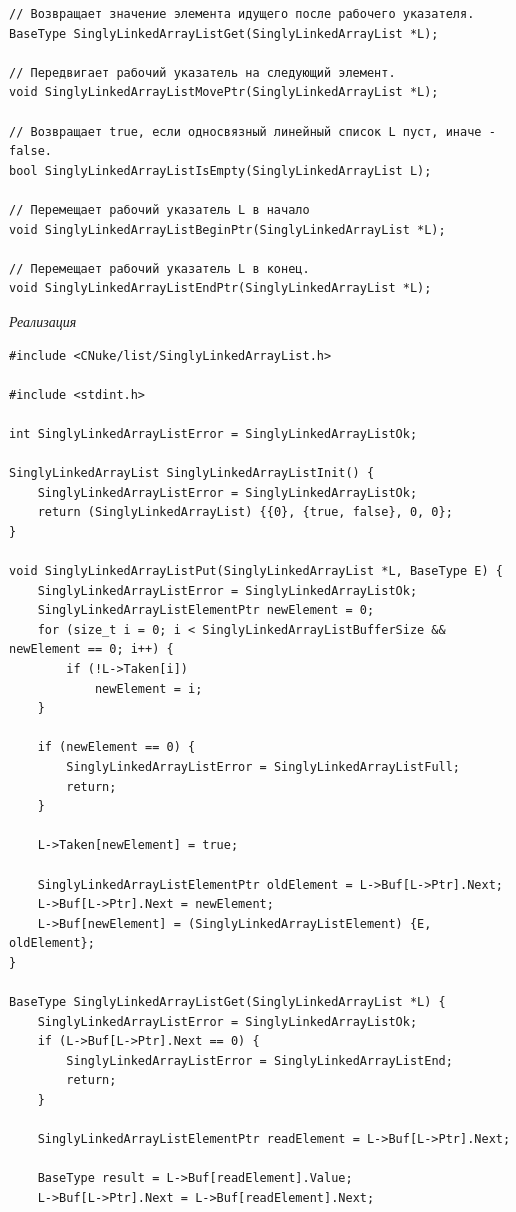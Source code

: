 \documentclass[a4paper,14pt]{extarticle}
\begin{document}
\begin{enumerate}
\begin{verbatim}
// Возвращает значение элемента идущего после рабочего указателя.
BaseType SinglyLinkedArrayListGet(SinglyLinkedArrayList *L);

// Передвигает рабочий указатель на следующий элемент.
void SinglyLinkedArrayListMovePtr(SinglyLinkedArrayList *L);

// Возвращает true, если односвязный линейный список L пуст, иначе - false.
bool SinglyLinkedArrayListIsEmpty(SinglyLinkedArrayList L);

// Перемещает рабочий указатель L в начало
void SinglyLinkedArrayListBeginPtr(SinglyLinkedArrayList *L);

// Перемещает рабочий указатель L в конец.
void SinglyLinkedArrayListEndPtr(SinglyLinkedArrayList *L);
    \end{verbatim}
    \textit{Реализация}
\begin{verbatim}
#include <CNuke/list/SinglyLinkedArrayList.h>

#include <stdint.h>

int SinglyLinkedArrayListError = SinglyLinkedArrayListOk;

SinglyLinkedArrayList SinglyLinkedArrayListInit() {
    SinglyLinkedArrayListError = SinglyLinkedArrayListOk;
    return (SinglyLinkedArrayList) {{0}, {true, false}, 0, 0};
}

void SinglyLinkedArrayListPut(SinglyLinkedArrayList *L, BaseType E) {
    SinglyLinkedArrayListError = SinglyLinkedArrayListOk;
    SinglyLinkedArrayListElementPtr newElement = 0;
    for (size_t i = 0; i < SinglyLinkedArrayListBufferSize && newElement == 0; i++) {
        if (!L->Taken[i])
            newElement = i;
    }

    if (newElement == 0) {
        SinglyLinkedArrayListError = SinglyLinkedArrayListFull;
        return;
    }

    L->Taken[newElement] = true;

    SinglyLinkedArrayListElementPtr oldElement = L->Buf[L->Ptr].Next;
    L->Buf[L->Ptr].Next = newElement;
    L->Buf[newElement] = (SinglyLinkedArrayListElement) {E, oldElement};
}

BaseType SinglyLinkedArrayListGet(SinglyLinkedArrayList *L) {
    SinglyLinkedArrayListError = SinglyLinkedArrayListOk;
    if (L->Buf[L->Ptr].Next == 0) {
        SinglyLinkedArrayListError = SinglyLinkedArrayListEnd;
        return;
    }

    SinglyLinkedArrayListElementPtr readElement = L->Buf[L->Ptr].Next;

    BaseType result = L->Buf[readElement].Value;
    L->Buf[L->Ptr].Next = L->Buf[readElement].Next;


\end{verbatim}
\end{enumerate}
\end{document}
